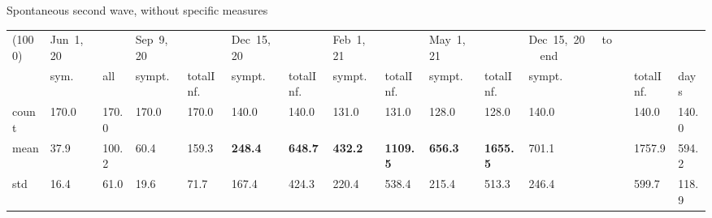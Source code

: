 \documentclass[8pt]{beamer}
\begin{document}
\begin{frame}{Spontaneous second wave, without specific measures}
\begin{table}[H]
\center
\tiny
\begin{tabular}{p{0.3cm}p{0.3cm}p{0.3cm}p{0.3cm}p{0.3cm}p{0.3cm}p{0.3cm}p{0.3cm}p{0.3cm}p{0.3cm}p{0.3cm}p{0.3cm}p{0.3cm}p{0.4cm}}
\toprule
(1000) &  Jun~1,~20 & &  Sep~9,~20 & & Dec~15,~20 & & Feb~1,~21 & & May~1,~21 & & Dec~15,~20~~~to~~~end  \\
{} &  sym. &  all &  sympt. &  totalInf. &  sympt. &  totalInf. &  sympt. &  totalInf. &  sympt. &  totalInf. &  sympt. &  totalInf.  & days\\
\midrule
count &    170.0 &                      170.0 &    170.0 &                      170.0 &    140.0 &                      140.0 &    131.0 &                      131.0 &    128.0 &                      128.0 &               140.0 &                   140.0 &  140.0 \\
mean  &     37.9 &                      100.2 &     60.4 &                      159.3 &    \textbf{248.4} &                      \textbf{648.7} &    \textbf{432.2} &                     \textbf{1109.5} &   \textbf{656.3} &                     \textbf{1655.5} &              701.1 &                  1757.9 &  594.2 \\
std   &     16.4 &                       61.0 &     19.6 &                       71.7 &    167.4 &                      424.3 &    220.4 &                      538.4 &    215.4 &                      513.3 &               246.4 &                   599.7 &  118.9 \\
\bottomrule
\end{tabular}

\label{selSpontWave2Tab}
\end{table}


\end{frame}
\end{document}
